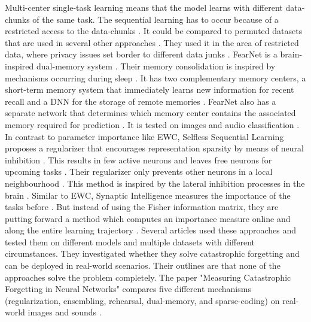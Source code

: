 Multi-center single-task learning means that the model learns with different data-chunks of the same task.
The sequential learning has to occur because of a restricted access to the data-chunks \cite{Keep_and_Learn}.
It could be compared to permuted datasets that are used in several other approaches \cite{Keep_and_Learn}.
They used it in the area of restricted data, where privacy issues set border to different data junks \cite{Keep_and_Learn}.
\newline
FearNet is a brain-inspired dual-memory system \cite{FearNet}.
Their memory consolidation is inspired by mechanisms occurring during sleep \cite{FearNet}.
It has two complementary memory centers, a short-term memory system that immediately learns new information for recent recall and a DNN for the storage of remote memories \cite{FearNet}.
FearNet also has a separate network that determines which memory center contains the associated memory required for prediction \cite{FearNet}.
It is tested on images and audio classification \cite{FearNet}.
\newline
In contrast to parameter importance like EWC, Selfless Sequential Learning proposes a regularizer that encourages representation sparsity by means of neural inhibition \cite{Selfless_Sequential_Learning}.
This results in few active neurons and leaves free neurons for upcoming tasks \cite{Selfless_Sequential_Learning}.
Their regularizer only prevents other neurons in a local neighbourhood \cite{Selfless_Sequential_Learning}.
This method is inspired by the lateral inhibition processes in the brain \cite{Selfless_Sequential_Learning}.
\newline
Similar to EWC, Synaptic Intelligence measures the importance of the tasks before \cite{Synaptic_Intelligence}.
But instead of using the Fisher information matrix, they are putting forward a method which computes an importance measure online and along the entire learning trajectory \cite{Synaptic_Intelligence}.
\newline
Several articles used these approaches and tested them on different models and multiple datasets with different circumstances.
They investigated whether they solve catastrophic forgetting and can be deployed in real-world scenarios.
Their outlines are that none of the approaches solve the problem completely.
\cite{measuring_cf_in_nns, cf_application_oriented_study}
\newline
The paper "Measuring Catastrophic Forgetting in Neural Networks" compares five different mechanisms (regularization, ensembling, rehearsal, dual-memory, and sparse-coding) on real-world images and sounds \cite{measuring_cf_in_nns}.

